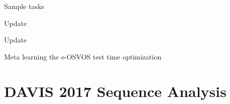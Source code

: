 \documentclass{article}
\begin{document}
    

\begin{algorithm}
    \footnotesize
    \KwOutput{ }
    {
        Sample tasks  \\
        \ForAll{}
        {
\For{ \KwTo }
            {
Update  }
            
}
        Update  \\
}

    \caption{Meta learning the e-OSVOS test time optimization}
    \label{alg:meta_training}
\end{algorithm}
 
\section{DAVIS 2017 Sequence Analysis}

    
\end{document}
